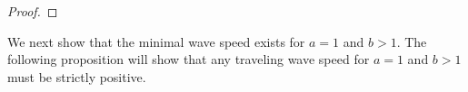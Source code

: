 \documentclass[11pt,a4paper]{article}
\numberwithin{equation}{section}
\numberwithin{figure}{section}
\begin{document}
\begin{proof}
\end{proof}

We next show that the minimal wave speed exists for $a=1$ and $b>1$.
The following proposition will show 
that any traveling wave speed for $a = 1$ and $b > 1$ must be strictly positive.
\end{document}
